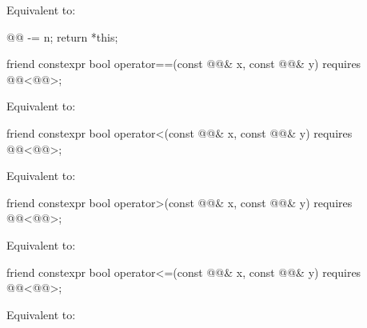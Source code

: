 \begin{itemdescr}
\pnum
\effects
Equivalent to:
\begin{codeblock}
@@ -= n;
return *this;
\end{codeblock}
\end{itemdescr}

%
\begin{itemdecl}
friend constexpr bool operator==(const @@& x, const @@& y)
  requires @@<@@>;
\end{itemdecl}

\begin{itemdescr}
\pnum
\effects
Equivalent to: 
\end{itemdescr}

%
\begin{itemdecl}
friend constexpr bool operator<(const @@& x, const @@& y)
  requires @@<@@>;
\end{itemdecl}

\begin{itemdescr}
\pnum
\effects
Equivalent to: 
\end{itemdescr}

%
\begin{itemdecl}
friend constexpr bool operator>(const @@& x, const @@& y)
  requires @@<@@>;
\end{itemdecl}

\begin{itemdescr}
\pnum
\effects
Equivalent to: 
\end{itemdescr}

%
\begin{itemdecl}
friend constexpr bool operator<=(const @@& x, const @@& y)
  requires @@<@@>;
\end{itemdecl}

\begin{itemdescr}
\pnum
\effects
Equivalent to: 
\end{itemdescr}

